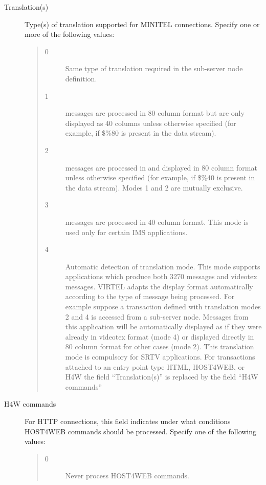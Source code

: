 \documentclass[letterpaper,10pt,english]{sphinxmanual}
\begin{document}
\begin{description}
\item[{Translation(s)}] \leavevmode
Type(s) of translation supported for MINITEL connections. Specify one or more of the following values:
\begin{quote}
\begin{description}
\item[{0}] \leavevmode
Same type of translation required in the sub-server node definition.

\item[{1}]  messages are processed in 80 column format but are only displayed as 40 columns unless otherwise specified (for example, if \$\%80 is present in the data stream).

\item[{2}]  messages are processed in and displayed in 80 column format unless otherwise specified (for example, if \$\%40 is present in the data stream).
Modes 1 and 2 are mutually exclusive.

\item[{3}]  messages are processed in 40 column format. This mode is used only for certain IMS applications.

\item[{4}] \leavevmode
Automatic detection of translation mode.
This mode supports applications which produce both 3270 messages and videotex messages. VIRTEL adapts the display format automatically according to the type of message being processed. For example suppose a transaction defined with translation modes 2 and 4 is accessed from a sub-server node. Messages from this application will be automatically displayed as if they were already in videotex format (mode 4) or displayed directly in 80 column format for other cases (mode 2).
This translation mode is compulsory for SRTV applications.
For transactions attached to an entry point type HTML, HOST4WEB, or H4W the field “Translation(s)” is replaced by the field “H4W commands”

\end{description}
\end{quote}

\item[{H4W commands}] \leavevmode
For HTTP connections, this field indicates under what conditions HOST4WEB commands should be processed. Specify one of the following values:
\begin{quote}
\begin{description}
\item[{0}] \leavevmode
Never process HOST4WEB commands.


\end{description}
\end{quote}
\end{description}
\end{document}
